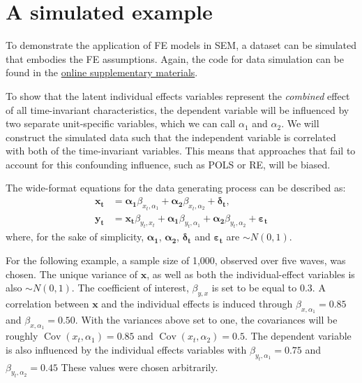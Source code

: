 \documentclass[]{interact}
\theoremstyle{plain}%
\theoremstyle{definition}
\theoremstyle{remark}
\begin{document}
\doublespacing

\hypertarget{ex1}{%
\section{A simulated example}\label{ex1}}

\singlespacing

\doublespacing

To demonstrate the application of FE models in SEM, a dataset can be
simulated that embodies the FE assumptions. Again, the code for data
simulation can be found in the
\href{https://github.com/henrik-andersen/FE-SEM/blob/master/simulation-code.R}{online
supplementary materials}.

To show that the latent individual effects variables represent the
\emph{combined} effect of all time-invariant characteristics, the
dependent variable will be influenced by two separate unit-specific
variables, which we can call \(\alpha_{1}\) and \(\alpha_{2}\). We will
construct the simulated data such that the independent variable is
correlated with both of the time-invariant variables. This means that
approaches that fail to account for this confounding influence, such as
POLS or RE, will be biased.

The wide-format equations for the data generating process can be
described as: \begin{align}
\bm{x_{t}} & = \bm{\alpha_{1}}\beta_{x_{t},\alpha_{1}} + \bm{\alpha_{2}}\beta_{x_{t},\alpha_{2}} + \bm{\delta_{t}}, \\
\bm{y_{t}} & = \bm{x_{t}}\beta_{y_{t},x_{t}} + \bm{\alpha_{1}}\beta_{y_{t},\alpha_{1}} + \bm{\alpha_{2}} \beta_{y_{t},\alpha_{2}} + \bm{\varepsilon_{t}} 
\end{align} where, for the sake of simplicity, \(\bm{\alpha_{1}}\),
\(\bm{\alpha_{2}}\), \(\bm{\delta_{t}}\) and \(\bm{\varepsilon_{t}}\)
are \(\sim N(0,1)\).

For the following example, a sample size of 1,000, observed over five
waves, was chosen. The unique variance of \(\bm{x}\), as well as both
the individual-effect variables is also \(\sim N(0,1)\). The coefficient
of interest, \(\beta_{y,x}\) is set to be equal to \(0.3\). A
correlation between \(\bm{x}\) and the individual effects is induced
through \(\beta_{x,\alpha_{1}} = 0.85\) and
\(\beta_{x,\alpha_{1}} = 0.50\). With the variances above set to one,
the covariances will be roughly
\(\mathop{\mathrm{\mathrm{Cov}}}(x_{t},\alpha_{1}) = 0.85\) and
\(\mathop{\mathrm{\mathrm{Cov}}}(x_{t},\alpha_{2}) = 0.5\). The
dependent variable is also influenced by the individual effects
variables with \(\beta_{y_{t},\alpha_{1}} = 0.75\) and
\(\beta_{y_{t},\alpha_{2}} = 0.45\) These values were chosen
arbitrarily.
\end{document}

